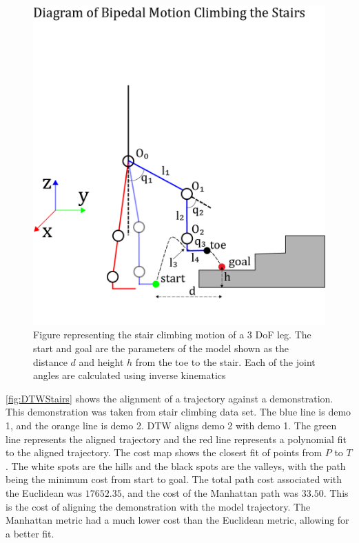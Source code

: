  
\begin{figure} 
    \centering 
    \includegraphics[scale=0.9]{images/stairs/stick.png}
    \caption[Stair Climbing Motion]{Figure representing the stair climbing motion of a 3 DoF leg. The start and goal are the parameters of the model shown as the distance $d$ and height $h$ from the toe to the stair. Each of the joint angles are calculated using inverse kinematics} 
    \label{fig:stick}
\end{figure} 

\autoref{fig:DTWStairs} shows the alignment of a trajectory against a demonstration. This demonstration was taken from stair climbing data set. The blue line is demo 1, and the orange line is demo 2. DTW aligns demo 2 with demo 1. The green line represents the aligned trajectory and the red line represents a polynomial fit to the aligned trajectory. The cost map shows the closest fit of points from $P$ to $T$. The white spots are the hills and the black spots are the valleys, with the path being the minimum cost from start to goal. The total path cost associated with the Euclidean was $17652.35$, and the cost of the Manhattan path was $33.50$. This is the cost of aligning the demonstration with the model trajectory. The Manhattan metric had a much lower cost than the Euclidean metric, allowing for a better fit. 

